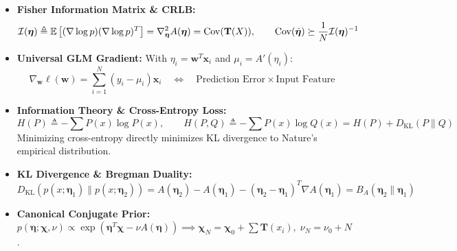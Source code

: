 \begin{tcolorbox}[breakable, colback=tealbg!30, colframe=tealborder, title={\large \textbf{6. Probability Foundations, The Exponential Family \& GLMs (Weeks 10--11)}}]
\begin{itemize}[leftmargin=*, noitemsep, topsep=2pt]
\begin{equation*}
    \end{equation*}
    \item \textbf{Fisher Information Matrix \& CRLB:}
    \begin{equation*}
    \mathcal{I}(\boldsymbol{\eta}) \triangleq \operatorname{\mathbb{E}}\left[ (\nabla \log p)(\nabla \log p)^T \right] = \nabla_{\boldsymbol{\eta}}^2 A(\boldsymbol{\eta}) = \operatorname{Cov}(\mathbf{T}(X)), \qquad \operatorname{Cov}(\hat{\boldsymbol{\eta}}) \succeq \frac{1}{N}\mathcal{I}(\boldsymbol{\eta})^{-1}
    \end{equation*}
    \item \textbf{Universal GLM Gradient:} With $\eta_i = \mathbf{w}^T \mathbf{x}_i$ and $\mu_i = A'(\eta_i)$:
    \begin{equation*}
    \nabla_{\mathbf{w}} \ell(\mathbf{w}) = \sum_{i=1}^N (y_i - \mu_i)\mathbf{x}_i \quad \iff \quad \text{Prediction Error} \times \text{Input Feature}
    \end{equation*}
    \item \textbf{Information Theory \& Cross-Entropy Loss:}
    \begin{equation*}
    H(P) \triangleq -\sum P(x) \log P(x), \qquad H(P, Q) \triangleq -\sum P(x) \log Q(x) = H(P) + D_{\text{KL}}(P \parallel Q)
    \end{equation*}
    Minimizing cross-entropy directly minimizes KL divergence to Nature's empirical distribution.
    \item \textbf{KL Divergence \& Bregman Duality:}
    \begin{equation*}
    D_{\text{KL}}\left( p(x; \boldsymbol{\eta}_1) \parallel p(x; \boldsymbol{\eta}_2) \right) = A(\boldsymbol{\eta}_2) - A(\boldsymbol{\eta}_1) - (\boldsymbol{\eta}_2 - \boldsymbol{\eta}_1)^T \nabla A(\boldsymbol{\eta}_1) = B_A(\boldsymbol{\eta}_2 \parallel \boldsymbol{\eta}_1)
    \end{equation*}
    \item \textbf{Canonical Conjugate Prior:} $p(\boldsymbol{\eta}; \boldsymbol{\chi}, \nu) \propto \exp(\boldsymbol{\eta}^T \boldsymbol{\chi} - \nu A(\boldsymbol{\eta})) \implies \boldsymbol{\chi}_N = \boldsymbol{\chi}_0 + \sum \mathbf{T}(x_i), \; \nu_N = \nu_0 + N$.
\end{itemize}
\end{tcolorbox}

